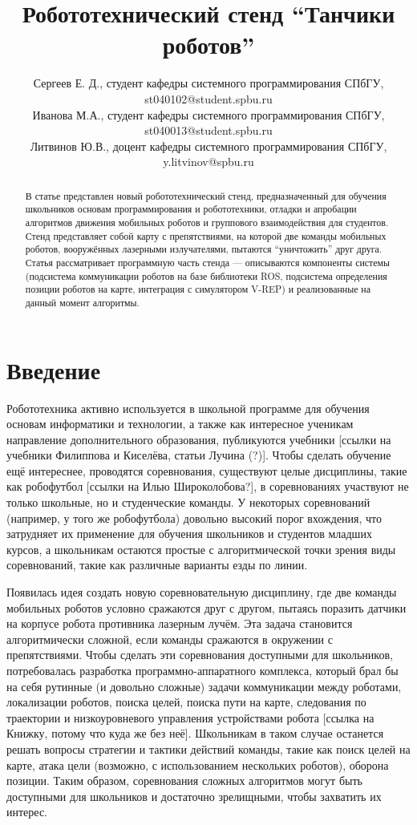 \documentclass{spisok-article}
\title{Робототехнический стенд ``Танчики роботов''}
\author{
	Сергеев Е. Д.,
	студент кафедры системного программирования СПбГУ,
	st040102@student.spbu.ru

	Иванова М.А.,
	студент кафедры системного программирования СПбГУ,
	st040013@student.spbu.ru

	Литвинов Ю.В.,
	доцент кафедры системного программирования СПбГУ, 
	y.litvinov@spbu.ru
}
\begin{document}
\maketitle

\begin{abstract}
В статье представлен новый робототехнический стенд, предназначенный для обучения школьников основам программирования и робототехники, отладки и апробации алгоритмов движения мобильных роботов и группового взаимодействия для студентов. Стенд представляет собой карту с препятствиями, на которой две команды мобильных роботов, вооружённых лазерными излучателями, пытаются ``уничтожить'' друг друга. Статья рассматривает программную часть стенда --- описываются компоненты системы (подсистема коммуникации роботов на базе библиотеки ROS, подсистема определения позиции роботов на карте, интеграция с симулятором V-REP) и реализованные на данный момент алгоритмы.
\end{abstract}

\section{Введение}

Робототехника активно используется в школьной программе для обучения основам информатики и технологии, а также как интересное ученикам направление дополнительного образования, публикуются учебники [ссылки на учебники Филиппова и Киселёва, статьи Лучина (?)]. Чтобы сделать обучение ещё интереснее, проводятся соревнования, существуют целые дисциплины, такие как робофутбол [ссылки на Илью Широколобова?], в соревнованиях участвуют не только школьные, но и студенческие команды. У некоторых соревнований (например, у того же робофутбола) довольно высокий порог вхождения, что затрудняет их применение для обучения школьников и студентов младших курсов, а школьникам остаются простые с алгоритмической точки зрения виды соревнований, такие как различные варианты езды по линии.

Появилась идея создать новую соревновательную дисциплину, где две команды мобильных роботов условно сражаются друг с другом, пытаясь поразить датчики на корпусе робота противника лазерным лучём. Эта задача становится алгоритмически сложной, если команды сражаются в окружении с препятствиями. Чтобы сделать эти соревнования доступными для школьников, потребовалась разработка программно-аппаратного комплекса, который брал бы на себя рутинные (и довольно сложные) задачи коммуникации между роботами, локализации роботов, поиска целей, поиска пути на карте, следования по траектории и низкоуровневого управления устройствами робота [ссылка на Книжку, потому что куда же без неё]. Школьникам в таком случае останется решать вопросы стратегии и тактики действий команды, такие как поиск целей на карте, атака цели (возможно, с использованием нескольких роботов), оборона позиции. Таким образом, соревнования сложных алгоритмов могут быть доступными для школьников и достаточно зрелищными, чтобы захватить их интерес.
\end{document}
